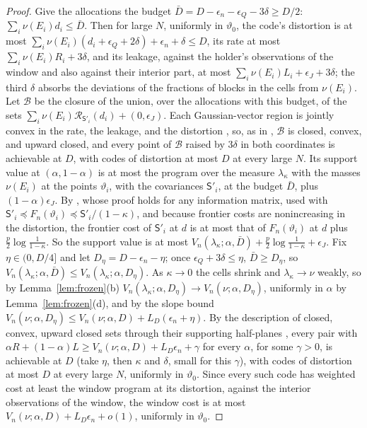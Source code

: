 \documentclass[11pt,onecolumn]{IEEEtran}
\begin{document}
\begin{proof}
Give the allocations the budget
$\bar D=D-\epsilon_n-\epsilon_Q-3\delta\ge D/2$: $\sum_i\nu(E_i)d_i\le\bar D$.
Then for large $N$, uniformly in $\vartheta_0$, the code's distortion is
at most $\sum_i\nu(E_i)(d_i+\epsilon_Q+2\delta)+\epsilon_n+\delta\le D$, its
rate at most $\sum_i\nu(E_i)R_i+3\delta$, and its leakage, against the
holder's observations of the window and also against their interior
part, at most $\sum_i\nu(E_i)L_i+\epsilon_J+3\delta$; the third $\delta$ absorbs
the deviations of the fractions of blocks in the cells from $\nu(E_i)$.
Let $\mathcal B$ be the
closure of the union, over the allocations with this budget, of the
sets $\sum_i\nu(E_i)\mathcal R_{\mathsf S'_i}(d_i)+(0,\epsilon_J)$. Each
Gaussian-vector region is jointly convex in the rate, the leakage, and
the distortion \cite[Theorem~5]{part1}, so, as in
\cite[proof of Theorem~13]{part3}, $\mathcal B$ is closed, convex, and
upward closed, and every point of $\mathcal B$ raised by $3\delta$ in
both coordinates is achievable at $D$, with codes of distortion at most
$D$ at every large $N$. Its support value at $(\alpha,1-\alpha)$ is at most
the program over the measure $\lambda_\kappa$ with the masses $\nu(E_i)$
at the points $\vartheta_i$, with the covariances $\mathsf S'_i$, at the
budget $\bar D$, plus $(1-\alpha)\epsilon_J$. By \cite[Lemma~11(b)]{part2}, whose proof holds for any information
matrix, used with $\mathsf S'_i\preceq F_n(\vartheta_i)\preceq\mathsf S'_i/(1-\kappa)$,
and because frontier costs are nonincreasing in the distortion, the
frontier cost of $\mathsf S'_i$ at $d$ is at most that of $F_n(\vartheta_i)$ at
$d$ plus $\tfrac p2\log\tfrac1{1-\kappa}$. So the support value is at most
$V_n(\lambda_\kappa;\alpha,\bar D)+\tfrac p2\log\tfrac1{1-\kappa}+\epsilon_J$. Fix
$\eta\in(0,D/4]$ and let $D_\eta=D-\epsilon_n-\eta$; once
$\epsilon_Q+3\delta\le\eta$, $\bar D\ge D_\eta$, so
$V_n(\lambda_\kappa;\alpha,\bar D)\le V_n(\lambda_\kappa;\alpha,D_\eta)$. As
$\kappa\to0$ the cells shrink and $\lambda_\kappa\to\nu$ weakly, so by
Lemma~\ref{lem:frozen}(b) $V_n(\lambda_\kappa;\alpha,D_\eta)\to V_n(\nu;\alpha,D_\eta)$,
uniformly in $\alpha$ by Lemma~\ref{lem:frozen}(d), and by the slope bound
$V_n(\nu;\alpha,D_\eta)\le V_n(\nu;\alpha,D)+L_D(\epsilon_n+\eta)$. By the
description of closed, convex, upward closed sets through their
supporting half-planes \cite[proof of Theorem~16]{part2}, every pair with
$\alpha R+(1-\alpha)L\ge V_n(\nu;\alpha,D)+L_D\epsilon_n+\gamma$ for every $\alpha$,
for some $\gamma>0$, is achievable at $D$ (take $\eta$, then $\kappa$ and
$\delta$, small for this $\gamma$), with codes of distortion at most $D$ at
every large $N$, uniformly in $\vartheta_0$. Since every such code has weighted cost at
least the window program at its distortion, against the interior
observations of the window, the window cost is at most
$V_n(\nu;\alpha,D)+L_D\epsilon_n+o(1)$, uniformly in $\vartheta_0$.


\end{proof}
\end{document}
